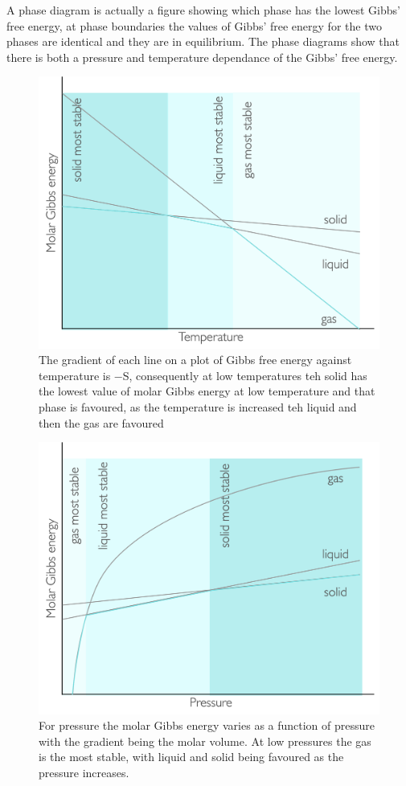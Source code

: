 \documentclass[
]{book}
\begin{document}
A phase diagram is actually a figure showing which phase has the lowest Gibbs' free energy, at phase boundaries the values of Gibbs' free energy for the two phases are identical and they are in equilibrium. The phase diagrams show that there is both a pressure and temperature dependance of the Gibbs' free energy.

\begin{figure}

{\centering \includegraphics[width=0.8\linewidth]{images/gibbstempstate} 

}

\caption{The gradient of each line on a plot of Gibbs free energy against temperature is −S, consequently at low temperatures teh solid has the lowest value of molar Gibbs energy at low temperature and that phase is favoured, as the temperature is increased teh liquid and then the gas are favoured}\label{fig:gibbstempstate}
\end{figure}

\begin{figure}

{\centering \includegraphics[width=0.8\linewidth]{images/gibbspressurestate} 

}

\caption{For pressure the molar Gibbs energy varies as a function of pressure with the gradient being the molar volume. At low pressures the gas is the most stable, with liquid and solid being favoured as the pressure increases.}\label{fig:gibbspressurestate}
\end{figure}
\end{document}
